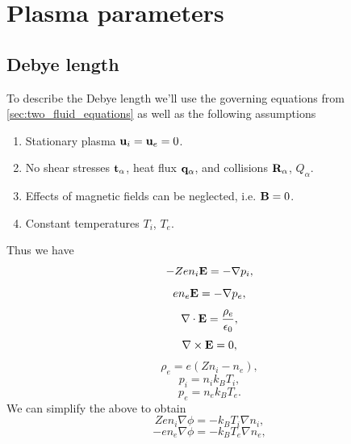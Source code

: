 \documentclass[a4paper,11pt]{report}
\begin{document}
\section{Plasma parameters}

\subsection{Debye length}
To describe the Debye length we'll use the governing equations from \cref{sec:two_fluid_equations} as well as the following assumptions
\begin{enumerate}
    \item Stationary plasma $\mathbf{u}_i = \mathbf{u}_e = 0$.
    \item No shear stresses $\mathbf{t}_\alpha$, heat flux $\mathbf{q}_\alpha$, and collisions $\mathbf{R}_\alpha$, $Q_\alpha$.
    \item Effects of magnetic fields can be neglected, i.e. $\mathbf{B}=0$.
    \item Constant temperatures $T_i$, $T_e$.
\end{enumerate}
Thus we have
\begin{equation*}
    -Zen_i\mathbf{E} = -\nabla p_i,
\end{equation*}
\begin{equation*}
    en_e\mathbf{E} = -\nabla p_e,
\end{equation*}
\begin{equation*}
    \nabla \cdot \mathbf{E} = \frac{\rho_e}{\epsilon_0},
\end{equation*}
\begin{equation*}
    \nabla \times \mathbf{E} = 0,
\end{equation*}
\begin{equation*}
    \rho_e = e(Zn_i - n_e),
\end{equation*}
\begin{equation*}
    p_i = n_i k_B T_i,
\end{equation*}
\begin{equation*}
    p_e = n_e k_B T_e.
\end{equation*}
We can simplify the above to obtain
\begin{equation*}
    Zen_i \nabla \phi = -k_B T_i \nabla n_i,
\end{equation*}
\begin{equation*}
    -en_e \nabla \phi = -k_B T_e \nabla n_e,
\end{equation*}
\end{document}

